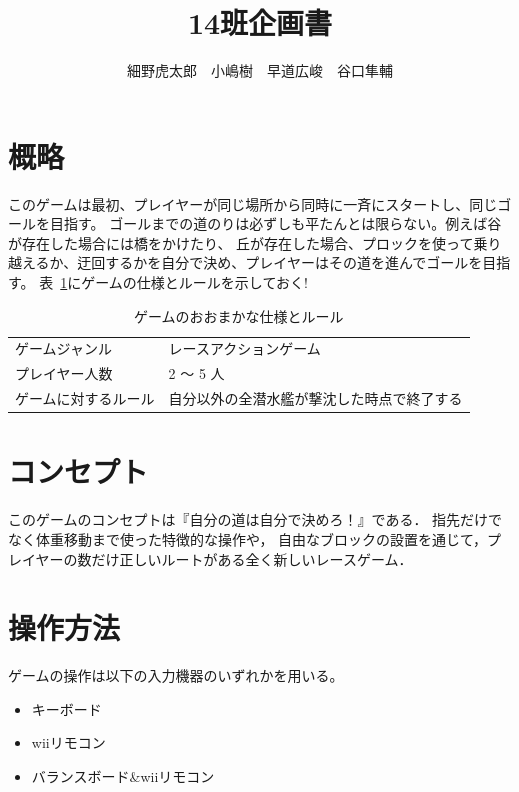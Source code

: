 \documentclass{jarticle}
\title{14班企画書}
\author{細野虎太郎　小嶋樹　早道広峻　谷口隼輔}
\begin{document}
\maketitle

\section{概略}
このゲームは最初、プレイヤーが同じ場所から同時に一斉にスタートし、同じゴールを目指す。
ゴールまでの道のりは必ずしも平たんとは限らない。例えば谷が存在した場合には橋をかけたり、
丘が存在した場合、プロックを使って乗り越えるか、迂回するかを自分で決め、プレイヤーはその道を進んでゴールを目指す。
表~\ref{table:rule}にゲームの仕様とルールを示しておく!
\begin{table}[H]
    \caption{ゲームのおおまかな仕様とルール}
    \label{table:rule}
    \begin{center}
    \begin{tabular}{|l|l|}\hline
    ゲームジャンル & レースアクションゲーム\\
    プレイヤー人数 & 2 ～ 5 人              \\
    ゲームに対するルール & 自分以外の全潜水艦が撃沈した時点で終了する \\ \hline
    \end{tabular}
    \end{center}
\end{table}

\section{コンセプト}
\label{コンセプト}
このゲームのコンセプトは『自分の道は自分で決めろ！』である．
指先だけでなく体重移動まで使った特徴的な操作や，
自由なブロックの設置を通じて，プレイヤーの数だけ正しいルートがある全く新しいレースゲーム．


\section{操作方法}
ゲームの操作は以下の入力機器のいずれかを用いる。
\begin{itemize}
    \item キーボード
    \item wiiリモコン
    \item バランスボード\&wiiリモコン
\end{itemize}
\end{document}
